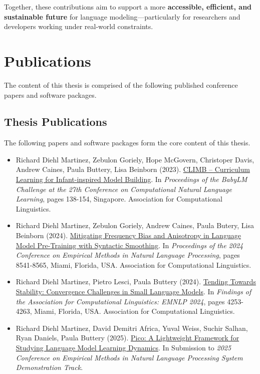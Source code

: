 Together, these contributions aim to support a more \textbf{accessible, efficient, and sustainable future} for language modeling—particularly for researchers and developers working under real-world constraints.

\newpage
\section*{Publications}

The content of this thesis is comprised of the following published conference papers and software packages.

\begin{tcolorbox}[
    enhanced,
    colback=white,
    colframe=thesisblue,
    arc=0mm,
    boxrule=1pt,
    left=10pt,
    right=10pt,
    top=10pt,
    bottom=10pt,
    title=Published Works,
    fonttitle=\bfseries,
    coltitle=white
]
\subsection*{Thesis Publications}
The following papers and software packages form the core content of this thesis.

\begin{itemize}
    \item Richard Diehl Martinez, Zebulon Goriely, Hope McGovern, Christoper Davis, Andrew Caines, Paula Buttery, Lisa Beinborn (2023). {\color{thesisblue}\href{https://aclanthology.org/2023.conll-1.10/}{CLIMB – Curriculum Learning for Infant-inspired Model Building}}. In \emph{Proceedings of the BabyLM Challenge at the 27th Conference on Computational Natural Language Learning}, pages 138-154, Singapore. Association for Computational Linguistics.

    \item Richard Diehl Martinez, Zebulon Goriely, Andrew Caines, Paula Butery, Lisa Beinborn (2024). {\color{thesisblue}\href{https://aclanthology.org/2024.emnlp-main.486/}{Mitigating Frequency Bias and Anisotropy in Language Model Pre-Training with Syntactic Smoothing}}. In \emph{Proceedings of the 2024 Conference on Empirical Methods in Natural Language Processing}, pages 8541-8565, Miami, Florida, USA. Association for Computational Linguistics.

    \item Richard Diehl Martinez, Pietro Lesci, Paula Buttery (2024). {\color{thesisblue}\href{https://aclanthology.org/2024.findings-emnlp.246/}{Tending Towards Stability: Convergence Challenges in Small Language Models}}. In \emph{Findings of the Association for Computational Linguistics: EMNLP 2024}, pages 4253-4263, Miami, Florida, USA. Association for Computational Linguistics.

    \item Richard Diehl Martinez, David Demitri Africa, Yuval Weiss, Suchir Salhan, Ryan Daniels, Paula Buttery (2025). {\color{thesisblue}\href{https://github.com/pico-lm}{Pico: A Lightweight Framework for Studying Language Model Learning Dynamics}}. In Submission to \emph{2025 Conference on Empirical Methods in Natural Language Processing System Demonstration Track}.
\end{itemize}
\end{tcolorbox}

